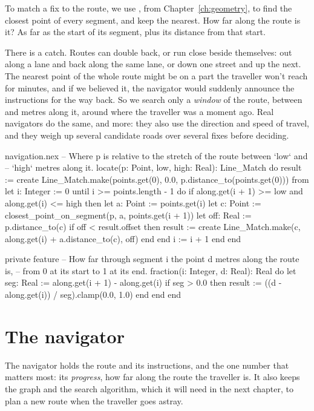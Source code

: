 To match a fix to the route, we use , from
Chapter~\ref{ch:geometry}, to find the closest point of every segment, and
keep the nearest. How far along the route is it? As far as the start of its
segment, plus its distance from that start.

There is a catch. Routes can double back, or run close beside themselves:
out along a lane and back along the same lane, or down one street and up
the next. The nearest point of the whole route might be on a part the
traveller won't reach for minutes, and if we believed it, the navigator
would suddenly announce the instructions for the way back. So we search
only a \emph{window} of the route, between  and 
metres along it, around where the traveller was a moment ago. Real
navigators do the same, and more: they also use the direction and speed of
travel, and they weigh up several candidate roads over several fixes before
deciding.

\begin{continued}{navigation.nex}
  -- Where p is relative to the stretch of the route between `low` and
  -- `high` metres along it.
  locate(p: Point, low, high: Real): Line_Match do
    result := create Line_Match.make(points.get(0), 0.0, p.distance_to(points.get(0)))
    from
      let i: Integer := 0
    until
      i >= points.length - 1
    do
      if along.get(i + 1) >= low and along.get(i) <= high then
        let a: Point := points.get(i)
        let c: Point := closest_point_on_segment(p, a, points.get(i + 1))
        let off: Real := p.distance_to(c)
        if off < result.offset then
          result := create Line_Match.make(c, along.get(i) + a.distance_to(c), off)
        end
      end
      i := i + 1
    end
  end

private feature
  -- How far through segment i the point d metres along the route is,
  -- from 0 at its start to 1 at its end.
  fraction(i: Integer, d: Real): Real do
    let seg: Real := along.get(i + 1) - along.get(i)
    if seg > 0.0 then
      result := ((d - along.get(i)) / seg).clamp(0.0, 1.0)
    end
  end
end
\end{continued}

\section{The navigator}

The navigator holds the route and its instructions, and the one number
that matters most: its \emph{progress}, how far along the route the
traveller is. It also keeps the graph and the search algorithm, which it
will need in the next chapter, to plan a new route when the traveller goes
astray.

